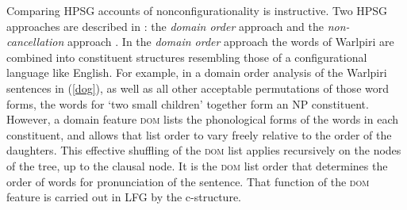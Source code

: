 
Comparing HPSG accounts of nonconfigurationality is instructive.   Two HPSG approaches are described in : the \emph{domain order} approach \citep{DS99a} and the \emph{non-cancellation} approach \citep{Bender2008a}. 
In the \emph{domain order}  approach the words of Warlpiri are combined into constituent structures resembling those of a configurational language like English.  For example, in a domain order analysis of the Warlpiri sentences in (\ref{dog}), as well as all other acceptable permutations of those word forms, the words for `two small children' together form an NP constituent.  However, a domain feature \textsc{dom} lists the phonological forms of the words in each constituent, and allows that list order to vary freely relative to the order of the daughters.  This effective shuffling of the \textsc{dom} list applies recursively on the nodes of the tree, up to the clausal node.  It is the \textsc{dom} list order that determines the order of words for  pronunciation of the sentence.  That function of the \textsc{dom} feature is carried out in LFG by the c-structure.    

